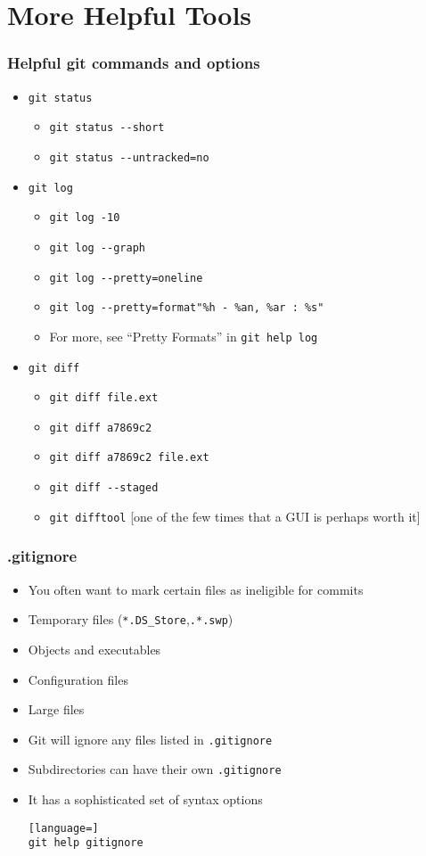 \section{More Helpful Tools}
\begin{frame}[fragile]
\frametitle{Helpful git commands and options}
\begin{itemize}
\item \lstinline{git status}
\begin{itemize}
\item \lstinline{git status --short}
\item \lstinline{git status --untracked=no}
\end{itemize}
\item \lstinline{git log}
\begin{itemize}
\item \lstinline{git log -10}
\item \lstinline{git log --graph}
\item \lstinline{git log --pretty=oneline}
\item \lstinline{git log --pretty=format"%h - %an, %ar : %s"}
\item For more, see ``Pretty Formats'' in \lstinline{git help log}
\end{itemize}
\item \lstinline{git diff}
\begin{itemize}
\item \lstinline{git diff file.ext}
\item \lstinline{git diff a7869c2}
\item \lstinline{git diff a7869c2 file.ext}
\item \lstinline{git diff --staged}
\item \lstinline{git difftool} [one of the few times that a GUI is perhaps worth it]
\end{itemize}
\end{itemize}
\end{frame}

\begin{frame}[fragile]
\frametitle{.gitignore}
\begin{itemize}
\item You often want to mark certain files as ineligible for commits
\item Temporary files (\lstinline{*.DS_Store},\lstinline{.*.swp})
\item Objects and executables
\item Configuration files
\item Large files
\item Git will ignore any files listed in \lstinline{.gitignore}
\item Subdirectories can have their own \lstinline{.gitignore}
\item It has a sophisticated set of syntax options
\begin{lstlisting}[language=]
git help gitignore
\end{lstlisting}
\end{itemize}
\end{frame}

